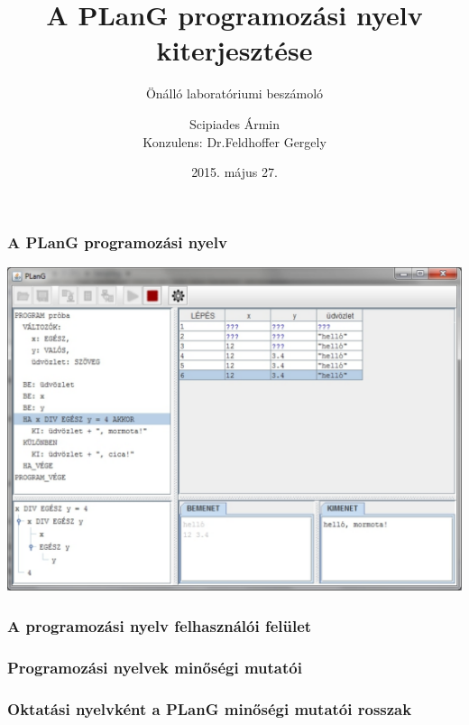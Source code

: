 \documentclass{beamer}
\title{A PLanG programozási nyelv kiterjesztése}
\subtitle{Önálló laboratóriumi beszámoló}
\author{Scipiades Ármin\\\bigskip Konzulens: Dr.\thinspace Feldhoffer Gergely}
\date{2015. május 27.}
\begin{document}
\frame{\titlepage}

\begin{frame}
	\frametitle{A PLanG programozási nyelv}
	\centering
	\includegraphics[width=\linewidth,height=\textheight,keepaspectratio]{images/plang.pdf}
\end{frame}

\begin{frame}
	\frametitle{A programozási nyelv felhasználói felület}	
	\centering
	\begin{adjustbox}{max totalsize={\textwidth}{\textheight},center}
	
	\end{adjustbox}	
\end{frame}

\begin{frame}
	\frametitle{Programozási nyelvek minőségi mutatói}
	\centering
	\begin{adjustbox}{max totalsize={\textwidth}{\textheight},center}
	
	\end{adjustbox}
\end{frame}

\begin{frame}
	\frametitle{Oktatási nyelvként a PLanG minőségi mutatói rosszak}
	\centering
	\begin{adjustbox}{max totalsize={\textwidth}{\textheight},center}
	
	\end{adjustbox}
\end{frame}
\end{document}
